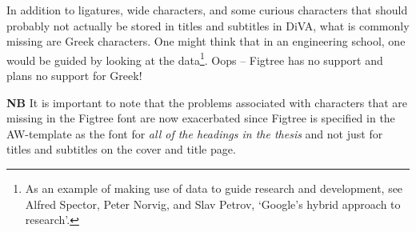 \documentclass[12pt, twoside]{article}
\begin{document}
In addition to ligatures, wide characters, and some curious characters that should probably not actually be stored in titles and subtitles in \gls{DiVA}, what is commonly missing are Greek characters. One might think that in an engineering school, one would be guided by looking at the data\footnote{As an example of making use of data to guide research and development, see Alfred Spector, Peter Norvig, and Slav Petrov, ‘Google’s hybrid approach to research’\cite{10.1145/2209249.2209262}.}. Oops -- Figtree has no support and plans no support for Greek!

\textbf{NB} It is important to note that the problems associated with characters that are missing in the Figtree font are now exacerbated since Figtree is specified in the AW-template as the font for \textit{all of the headings in the thesis} and not just for titles and subtitles on the cover and title page.
\end{document}
